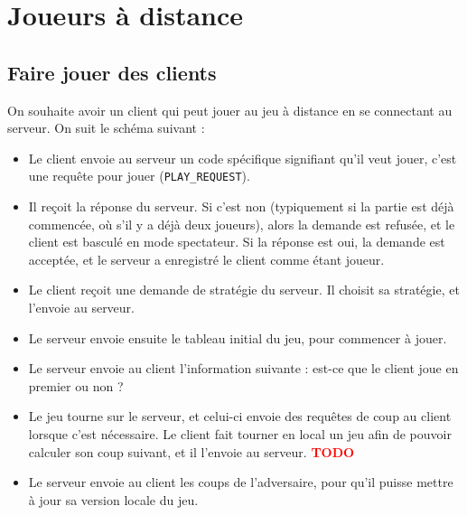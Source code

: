 \documentclass[a4paper]{article}
\newcommand{\TODO}{\textcolor{red}{\textbf{TODO}}}
\begin{document}
\section{Joueurs à distance}

\subsection{Faire jouer des clients}

On souhaite avoir un client qui peut jouer au jeu à distance en se connectant au serveur. On suit le schéma suivant :

%
\begin{itemize}
	\setlength\itemsep{0.5em}
	\item Le client envoie au serveur un code spécifique signifiant qu'il veut jouer, c'est une requête pour jouer (\texttt{PLAY\_REQUEST}).
	\item Il reçoit la réponse du serveur. Si c'est non (typiquement si la partie est déjà commencée, où s'il y a déjà deux joueurs), alors la demande est refusée, et le client est basculé en mode spectateur. Si la réponse est oui, la demande est acceptée, et le serveur a enregistré le client comme étant joueur.
	\item Le client reçoit une demande de stratégie du serveur. Il choisit sa stratégie, et l'envoie au serveur.
	\item Le serveur envoie ensuite le tableau initial du jeu, pour commencer à jouer.
	\item Le serveur envoie au client l'information suivante : est-ce que le client joue en premier ou non ?
	\item Le jeu tourne sur le serveur, et celui-ci envoie des requêtes de coup au client lorsque c'est nécessaire. Le client fait tourner en local un jeu afin de pouvoir calculer son coup suivant, et il l'envoie au serveur. \TODO
	\item Le serveur envoie au client les coups de l'adversaire, pour qu'il puisse mettre à jour sa version locale du jeu.
\end{itemize}
%
\end{document}
